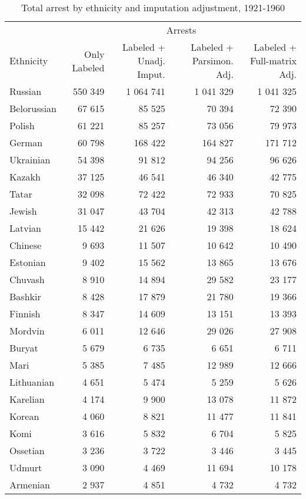 \begin{table}[!h]

\caption{\label{tab:total_arrests_by_ethnicity}Total arrest by ethnicity and imputation adjustment, 1921-1960}
\centering
\fontsize{8}{9}\selectfont
\begin{tabular}{lrrrr}
\toprule
\multicolumn{1}{c}{ } & \multicolumn{4}{c}{Arrests} \\
\cmidrule(l{2pt}r{2pt}){2-5}
Ethnicity & Only Labeled & Labeled + Unadj. Imput. & Labeled + Parsimon. Adj. & Labeled + Full-matrix Adj.\\
\midrule
Russian & 550 349 & 1 064 741 & 1 041 329 & 1 041 325\\
Belorussian & 67 615 & 85 525 & 70 394 & 72 390\\
Polish & 61 221 & 85 257 & 73 056 & 79 973\\
German & 60 798 & 168 422 & 164 827 & 171 712\\
Ukrainian & 54 398 & 91 812 & 94 256 & 96 626\\
Kazakh & 37 125 & 46 541 & 46 340 & 42 775\\
Tatar & 32 098 & 72 422 & 72 933 & 70 825\\
Jewish & 31 047 & 43 704 & 42 313 & 42 788\\
Latvian & 15 442 & 21 626 & 19 398 & 18 624\\
Chinese & 9 693 & 11 507 & 10 642 & 10 490\\
Estonian & 9 402 & 15 562 & 13 865 & 13 676\\
Chuvash & 8 910 & 14 894 & 29 582 & 23 177\\
Bashkir & 8 428 & 17 879 & 21 780 & 19 366\\
Finnish & 8 347 & 14 609 & 13 151 & 13 393\\
Mordvin & 6 011 & 12 646 & 29 026 & 27 908\\
Buryat & 5 679 & 6 735 & 6 651 & 6 711\\
Mari & 5 385 & 7 485 & 12 989 & 12 666\\
Lithuanian & 4 651 & 5 474 & 5 259 & 5 626\\
Karelian & 4 174 & 9 900 & 13 078 & 11 872\\
Korean & 4 060 & 8 821 & 11 477 & 11 841\\
Komi & 3 616 & 5 832 & 6 704 & 5 825\\
Ossetian & 3 236 & 3 722 & 3 446 & 3 445\\
Udmurt & 3 090 & 4 469 & 11 694 & 10 178\\
Armenian & 2 937 & 4 851 & 4 732 & 4 732\\

\end{tabular}
\end{table}
